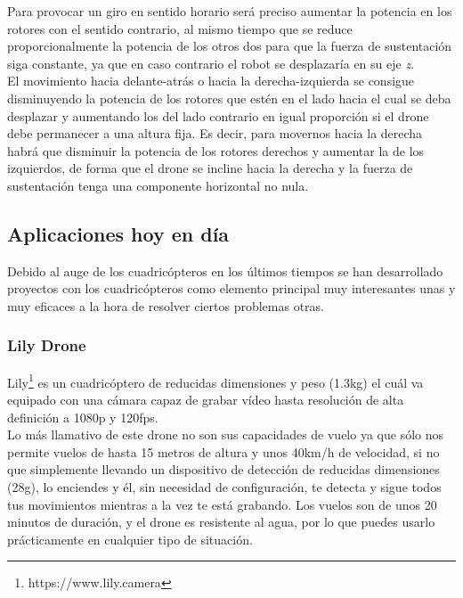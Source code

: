 Para provocar un giro en sentido horario será preciso aumentar la potencia en los rotores con el sentido contrario, al mismo tiempo que se reduce proporcionalmente la potencia de los otros dos para que la fuerza de sustentación siga constante, ya que en caso contrario el robot se desplazaría en su eje \emph{z}.\\


El movimiento hacia delante-atrás o hacia la derecha-izquierda se consigue disminuyendo la potencia de los rotores que estén en el lado hacia el cual se deba desplazar y aumentando los del lado contrario en igual proporción si el drone debe permanecer a una altura fija. Es decir, para movernos hacia la derecha habrá que disminuir la potencia de los rotores derechos y aumentar la de los izquierdos, de forma que el drone se incline hacia la derecha y la fuerza de sustentación tenga una componente horizontal no nula.\\


\subsection{Aplicaciones hoy en día}

Debido al auge de los cuadricópteros en los últimos tiempos se han desarrollado proyectos con los cuadricópteros como elemento principal muy interesantes unas y muy eficaces a la hora de resolver ciertos problemas otras.\\

\subsubsection{Lily Drone} 

Lily\footnote{https://www.lily.camera} es un cuadricóptero de reducidas dimensiones y peso (1.3kg) el cuál va equipado con una cámara capaz de grabar vídeo hasta resolución de alta definición a 1080p y 120fps.\\

Lo más llamativo de este drone no son sus capacidades de vuelo ya que sólo nos permite vuelos de hasta 15 metros de altura y unos 40km/h de velocidad, si no que simplemente llevando un dispositivo de detección de reducidas dimensiones (28g), lo enciendes y él, sin necesidad de configuración, te detecta y sigue todos tus movimientos mientras a la vez te está grabando. Los vuelos son de unos 20 minutos de duración, y el drone es resistente al agua, por lo que puedes usarlo prácticamente en cualquier tipo de situación.\\


